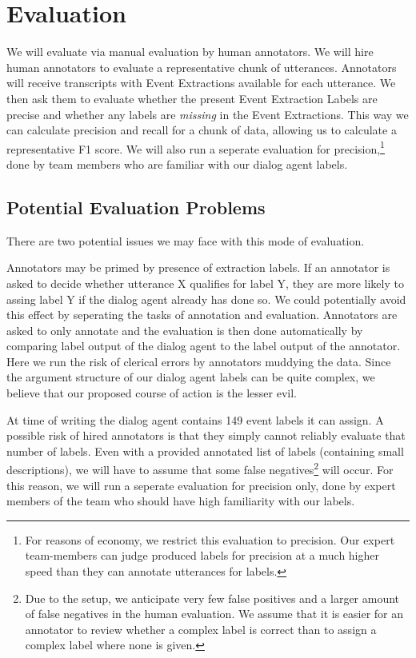 \section{Evaluation}
We will evaluate via manual evaluation by human annotators. We will hire human annotators to evaluate a representative chunk of utterances. Annotators will receive transcripts with Event Extractions available for each utterance. We then ask them to evaluate whether the present Event Extraction Labels are precise and whether any labels are \emph{missing} in the Event Extractions. This way we can calculate precision and recall for a chunk of data, allowing us to calculate a representative F1 score.
We will also run a seperate evaluation for precision,\footnote{For reasons of economy, we restrict this evaluation to precision. Our expert team-members can judge produced labels for precision at a much higher speed than they can annotate utterances for labels.} done by team members who are familiar with our dialog agent labels.
\subsection{Potential Evaluation Problems}
There are two potential issues we may face with this mode of evaluation. 

Annotators may be primed by presence of extraction labels. If an annotator is asked to decide whether utterance X qualifies for label Y, they are more likely to assing label Y if the dialog agent already has done so. We could potentially avoid this effect by seperating the tasks of annotation and evaluation. Annotators are asked to only annotate and the evaluation is then done automatically by comparing label output of the dialog agent to the label output of the annotator. Here we run the risk of clerical errors by annotators muddying the data. Since the argument structure of our dialog agent labels can be quite complex, we believe that our proposed course of action is the lesser evil.

At time of writing the dialog agent contains 149 event labels it can assign. A possible risk of hired annotators is that they simply cannot reliably evaluate that number of labels. Even with a provided annotated list of labels (containing small descriptions), we will have to assume that some false negatives\footnote{Due to the setup, we anticipate very few false positives and a larger amount of false negatives in the human evaluation. We assume that it is easier for an annotator to review whether a complex label is correct than to assign a complex label where none is given.} will occur. For this reason, we will run a seperate evaluation for precision only, done by expert members of the team who should have high familiarity with our labels.
